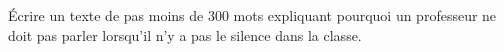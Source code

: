 
\begin{exercice}\label{exosmath-0423}

Écrire un texte de pas moins de 300 mots expliquant pourquoi un professeur ne doit pas parler lorsqu'il n'y a pas le silence dans la classe.

\end{exercice}
